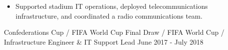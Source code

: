 
\begin{cventries}
\cventry
{
\vspace{-0.4cm}
\begin{itemize}
\item Supported stadium IT operations, deployed telecommunications infrastructure, and coordinated a radio communications team.
\end{itemize}
}
{Confederations Cup / FIFA World Cup Final Draw / FIFA World Cup / Infrastructure Engineer \& IT Support Lead}
{}
{June 2017 - July 2018}
\end{cventries}
